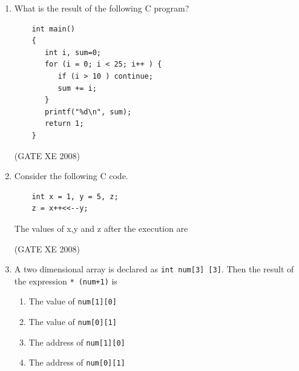 \documentclass[12pt]{article}
\begin{document}
\begin{enumerate}
(GATE XE 2008)
\item  What is the result of the following C program?
\begin{verbatim}
    int main()
    {
       int i, sum=0;
       for (i = 0; i < 25; i++ ) {
          if (i > 10 ) continue;
          sum += i;
       }
       printf("%d\n", sum);
       return 1;
    }   
\end{verbatim}

\begin{enumerate}
\end{enumerate}

(GATE XE 2008)
\item  Consider the following C code.
\begin{verbatim}
    int x = 1, y = 5, z;
    z = x++<<--y;

\end{verbatim}
The values of x,y and z after the execution are

\begin{enumerate}
\end{enumerate}

(GATE XE 2008)
\item A two dimensional array is declared as \texttt{int num[3] [3]}. Then the result of the expression \texttt{* (num+1)} is

\begin{enumerate}
\item The value of \texttt{num[1][0]}

\item  The value of \texttt{num[0][1]}

\item  The address of \texttt{num[1][0]}

\item  The address of \texttt{num[0][1]}
\end{enumerate}


\end{enumerate}
\end{document}

